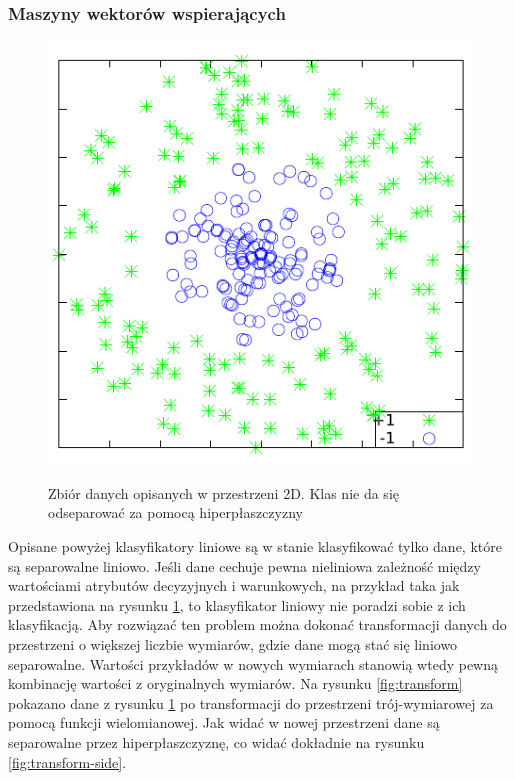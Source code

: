 \subsubsection{Maszyny wektorów wspierających}


\begin{figure}[h]
\centering
\includegraphics[scale=1]{figures/functions/2-nonlinear}
\label{fig:nonlinear}
\caption{Zbiór danych opisanych w przestrzeni 2D. Klas nie da się odseparować za pomocą hiperpłaszczyzny}
\end{figure}

Opisane powyżej klasyfikatory liniowe są w stanie klasyfikować tylko dane, które są separowalne liniowo. Jeśli dane cechuje pewna nieliniowa zależność między wartościami atrybutów decyzyjnych i warunkowych, na przykład taka jak przedstawiona na rysunku \ref{fig:nonlinear}, to klasyfikator liniowy nie poradzi sobie z ich klasyfikacją.
Aby rozwiązać ten problem można dokonać transformacji danych do przestrzeni o większej liczbie wymiarów, gdzie dane mogą stać się liniowo separowalne. Wartości przykładów w nowych wymiarach stanowią wtedy pewną kombinację wartości z oryginalnych wymiarów. Na rysunku \ref{fig:transform} pokazano dane z rysunku \ref{fig:nonlinear} po transformacji do przestrzeni trój-wymiarowej za pomocą funkcji wielomianowej. Jak widać w nowej przestrzeni dane są separowalne przez hiperpłaszczyznę, co widać dokładnie na rysunku \ref{fig:transform-side}.

